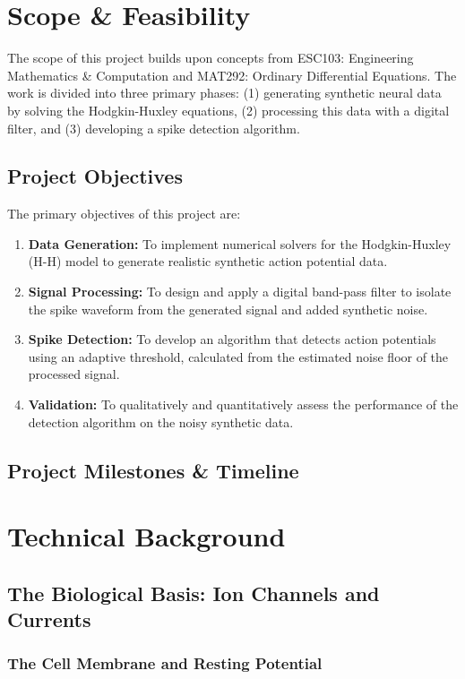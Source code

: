 \documentclass{article} %
\begin{document}
\begin{multicols}{2}
\section{Scope \& Feasibility}

The scope of this project builds upon concepts from ESC103: Engineering Mathematics \& Computation and MAT292: Ordinary Differential Equations. 
The work is divided into three primary phases: (1) generating synthetic neural data by solving the Hodgkin-Huxley equations, (2) processing this data with a digital filter, and (3) developing a spike detection algorithm.

\subsection{Project Objectives}
The primary objectives of this project are:
\begin{enumerate}
    \item \textbf{Data Generation:} To implement numerical solvers for the Hodgkin-Huxley (H-H) model to generate realistic synthetic action potential data.
    \item \textbf{Signal Processing:} To design and apply a digital band-pass filter to isolate the spike waveform from the generated signal and added synthetic noise.
    \item \textbf{Spike Detection:} To develop an algorithm that detects action potentials using an adaptive threshold, calculated from the estimated noise floor of the processed signal.
    \item \textbf{Validation:} To qualitatively and quantitatively assess the performance of the detection algorithm on the noisy synthetic data.
\end{enumerate}

\subsection{Project Milestones \& Timeline}



\section{Technical Background}

\subsection{The Biological Basis: Ion Channels and Currents}
\subsubsection{The Cell Membrane and Resting Potential}

\end{multicols}
\end{document}
